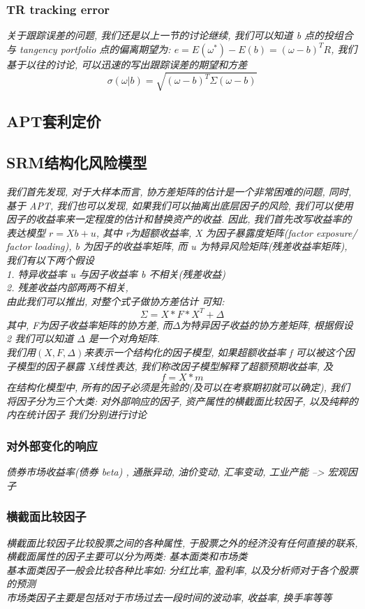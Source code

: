 \documentclass{scrartcl}
\numberwithin{equation}{section}
\begin{document}
\subsubsection{TR tracking error}

\textsl{
    关于跟踪误差的问题, 我们还是以上一节的讨论继续, 我们可以知道 b 点的投组合与 tangency portfolio 点的偏离期望为: $e= E(\omega^*) - E(b) = (\omega - b ) ^T R$, 我们基于以往的讨论, 可以迅速的写出跟踪误差的期望和方差$$\sigma(\omega|b) =  \sqrt{(\omega-b )^T \Sigma (\omega- b)}$$
}



\subsection{APT套利定价}


\subsection{SRM结构化风险模型}

\textsl{
    我们首先发现, 对于大样本而言, 协方差矩阵的估计是一个非常困难的问题, 同时, 基于 APT, 我们也可以发现, 如果我们可以抽离出底层因子的风险, 我们可以使用因子的收益率来一定程度的估计和替换资产的收益. 因此, 我们首先改写收益率的表达模型 $ r = X b + u$, 其中 r为超额收益率, X 为因子暴露度矩阵(factor exposure/ factor loading), b 为因子的收益率矩阵, 而 u 为特异风险矩阵(残差收益率矩阵), 我们有以下两个假设\\ 1. 特异收益率 u 与因子收益率 b 不相关(残差收益)\\ 2. 残差收益内部两两不相关,\\ 由此我们可以推出, 对整个式子做协方差估计 可知:$$\Sigma= X* F* X^T + \Delta$$ 其中, F为因子收益率矩阵的协方差, 而$\Delta$为特异因子收益的协方差矩阵, 根据假设 2 我们可以知道 $\Delta$ 是一个对角矩阵.\\ 我们用$(X, F, \Delta)$来表示一个结构化的因子模型, 如果超额收益率 f 可以被这个因子模型的因子暴露 X线性表达, 我们称改因子模型解释了超额预期收益率, 及 $$f = X*m $$ 在结构化模型中, 所有的因子必须是先验的(及可以在考察期初就可以确定), 我们将因子分为三个大类: 对外部响应的因子, 资产属性的横截面比较因子, 以及纯粹的内在统计因子 我们分别进行讨论
}
\subsubsection{对外部变化的响应}
\textsl{
    债券市场收益率(债券 beta) , 通胀异动, 油价变动, 汇率变动, 工业产能  --> 宏观因子
}
\subsubsection{横截面比较因子}
\textsl{横截面比较因子比较股票之间的各种属性, 于股票之外的经济没有任何直接的联系, 横截面属性的因子主要可以分为两类: 基本面类和市场类\\基本面类因子一般会比较各种比率如: 分红比率, 盈利率, 以及分析师对于各个股票的预测 \\市场类因子主要是包括对于市场过去一段时间的波动率, 收益率, 换手率等等}
\end{document}
